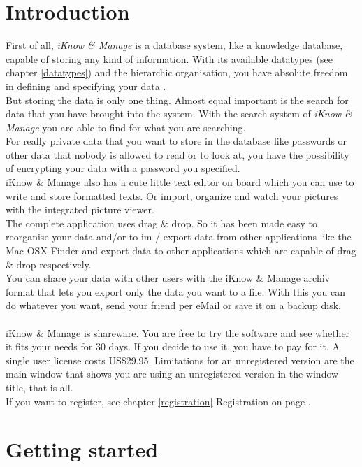 \documentclass[12pt,a4]{article}
\begin{document}
\section{Introduction}
\label{introduction}
\medskip
First of all, \textit{iKnow \& Manage} is a database system, like a knowledge database, capable of storing any kind of information. With its available datatypes (see chapter \ref{datatypes}) and the hierarchic organisation, you have absolute freedom in defining and specifying your data . \\
But storing the data is only one thing. Almost equal important is the search for data that you have brought into the system. With the search system of \textit{iKnow \& Manage} you are able to find for what you are searching. \\
For really private data that you want to store in the database like passwords or other data that nobody is allowed to read or to look at, you have the possibility of encrypting your data with a password you specified. \\
iKnow \& Manage also has a cute little text editor on board which you can use to write and store formatted texts. Or import, organize and watch your pictures with the integrated picture viewer. \\
The complete application uses drag \& drop. So it has been made easy to reorganise your data and/or to im-/ export data from other applications like the Mac OSX Finder and export data to other applications which are capable of drag \& drop respectively. \\
You can share your data with other users with the iKnow \& Manage archiv format that lets you export only the data you want to a file. With this you can do whatever you want, send your friend per eMail or save it on a backup disk. \\
\\
iKnow \& Manage is shareware. You are free to try the software and see whether it fits your needs for 30 days. If you decide to use it, you have to pay for it. A single user license costs US\$29.95. Limitations for an unregistered version are the main window that shows you are using an unregistered version in the window title, that is all. \\
If you want to register, see chapter \ref{registration} Registration on page \pageref{registration}.
\section{Getting started}
\label{getting_started}
\medskip
\end{document}
